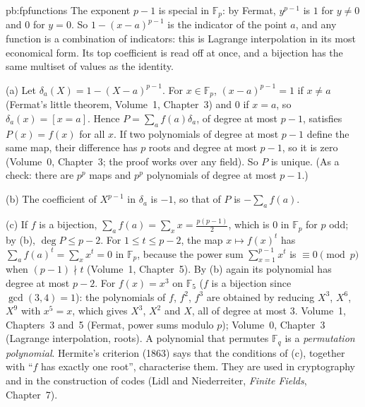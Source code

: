 \begin{solution}{pb:fpfunctions}
\idea The exponent $p-1$ is special in $\mathbb F_p$: by Fermat, $y^{p-1}$ is $1$ for $y\ne0$ and $0$ for $y=0$. So
$1-(x-a)^{p-1}$ is the indicator of the point $a$, and any function is a combination of indicators: this is Lagrange
interpolation in its most economical form. Its top coefficient is read off at once, and a bijection has the same multiset of
values as the identity.

\writeup (a) Let $\delta_a(X)=1-(X-a)^{p-1}$. For $x\in\mathbb F_p$, $(x-a)^{p-1}=1$ if $x\ne a$ (Fermat's little theorem,
Volume~1, Chapter~3) and $0$ if $x=a$, so $\delta_a(x)=[x=a]$. Hence $P=\sum_af(a)\delta_a$, of degree at most $p-1$, satisfies
$P(x)=f(x)$ for all $x$. If two polynomials of degree at most $p-1$ define the same map, their difference has $p$ roots and
degree at most $p-1$, so it is zero (Volume~0, Chapter~3; the proof works over any field). So $P$ is unique. (As a check: there
are $p^p$ maps and $p^p$ polynomials of degree at most $p-1$.)

(b) The coefficient of $X^{p-1}$ in $\delta_a$ is $-1$, so that of $P$ is $-\sum_af(a)$.

(c) If $f$ is a bijection, $\sum_af(a)=\sum_xx=\frac{p(p-1)}2$, which is $0$ in $\mathbb F_p$ for $p$ odd; by (b), $\deg P\le
p-2$. For $1\le t\le p-2$, the map $x\mapsto f(x)^t$ has $\sum_af(a)^t=\sum_xx^t=0$ in $\mathbb F_p$, because the power sum
$\sum_{x=1}^{p-1}x^t$ is $\equiv0\pmod p$ when $(p-1)\nmid t$ (Volume~1, Chapter~5). By (b) again its polynomial has degree at
most $p-2$. For $f(x)=x^3$ on $\mathbb F_5$ ($f$ is a bijection since $\gcd(3,4)=1$): the polynomials of $f$, $f^2$, $f^3$ are
obtained by reducing $X^3$, $X^6$, $X^9$ with $x^5=x$, which gives $X^3$, $X^2$ and $X$, all of degree at most $3$.
\tools Volume~1, Chapters~3 and~5 (Fermat, power sums modulo $p$); Volume~0, Chapter~3 (Lagrange interpolation, roots).
\leads A polynomial that permutes $\mathbb F_q$ is a \emph{permutation polynomial}. Hermite's criterion (1863) says that the
conditions of (c), together with ``$f$ has exactly one root'', characterise them. They are used in cryptography and in the
construction of codes (Lidl and Niederreiter, \emph{Finite Fields}, Chapter~7).
\end{solution}

